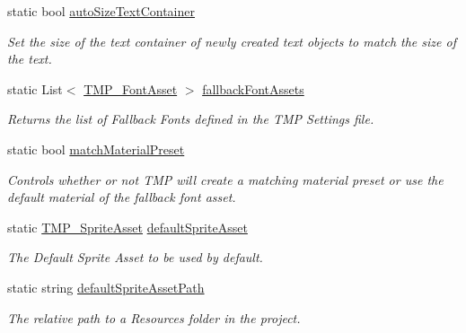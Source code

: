\begin{DoxyCompactItemize}
static bool \mbox{\hyperlink{class_t_m_pro_1_1_t_m_p___settings_af4d34759470d229c8a600bc45a9aac35}{auto\+Size\+Text\+Container}}
\begin{DoxyCompactList}\small\item\em Set the size of the text container of newly created text objects to match the size of the text. \end{DoxyCompactList}\item 
static List$<$ \mbox{\hyperlink{class_t_m_pro_1_1_t_m_p___font_asset}{T\+M\+P\+\_\+\+Font\+Asset}} $>$ \mbox{\hyperlink{class_t_m_pro_1_1_t_m_p___settings_a2239a7f8504614b295bcee82ccffeaa5}{fallback\+Font\+Assets}}
\begin{DoxyCompactList}\small\item\em Returns the list of Fallback Fonts defined in the T\+MP Settings file. \end{DoxyCompactList}\item 
static bool \mbox{\hyperlink{class_t_m_pro_1_1_t_m_p___settings_a36e3ac5a0d8d49a625078c41791a5139}{match\+Material\+Preset}}
\begin{DoxyCompactList}\small\item\em Controls whether or not T\+MP will create a matching material preset or use the default material of the fallback font asset. \end{DoxyCompactList}\item 
static \mbox{\hyperlink{class_t_m_pro_1_1_t_m_p___sprite_asset}{T\+M\+P\+\_\+\+Sprite\+Asset}} \mbox{\hyperlink{class_t_m_pro_1_1_t_m_p___settings_af8adcb47c6fb911f0899f7c5a483cda7}{default\+Sprite\+Asset}}
\begin{DoxyCompactList}\small\item\em The Default Sprite Asset to be used by default. \end{DoxyCompactList}\item 
static string \mbox{\hyperlink{class_t_m_pro_1_1_t_m_p___settings_aeb77f2b6f17210b8200ecd4d353ea65f}{default\+Sprite\+Asset\+Path}}
\begin{DoxyCompactList}\small\item\em The relative path to a Resources folder in the project. \end{DoxyCompactList}\item 

\end{DoxyCompactItemize}
